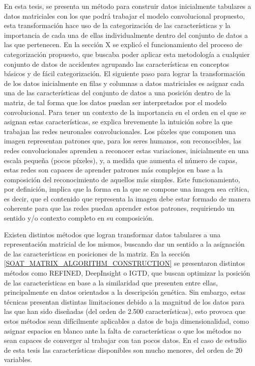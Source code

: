 \documentclass{uathesis-es}
\begin{document}
{	En esta tesis, se presenta un método para construir datos inicialmente tabulares a datos matriciales con los que podrá trabajar el modelo convolucional propuesto, esta transformación hace uso de la categorización de las características y la importancia de cada una de ellas individualmente dentro del conjunto de datos a las que pertenecen. En la sección X se explicó el funcionamiento del proceso de categorización propuesto, que buscaba poder aplicar esta metodología a cualquier conjunto de datos de accidentes agrupando las características en conceptos básicos y de fácil categorización. El siguiente paso para lograr la transformación de los datos inicialmente en filas y columnas a datos matriciales es asignar cada una de las características del conjunto de datos a una posición dentro de la matriz, de tal forma que los datos puedan ser interpretados por el modelo convolucional. Para tener un contexto de la importancia en el orden en el que se asignan estas características, se explica brevemente la intuición sobre la que trabajan las redes neuronales convolucionales. Los píxeles que componen una imagen representan patrones que, para los seres humanos, son reconocibles, las redes convolucionales aprenden a reconocer estas variaciones, inicialmente en una escala pequeña (pocos píxeles), y, a medida que aumenta el número de capas, estas redes son capaces de aprender patrones más complejos en base a la composición del reconocimiento de aquellos más simples. Este funcionamiento, por definición, implica que la forma en la que se compone una imagen sea crítica, es decir, que el contenido que representa la imagen debe estar formado de manera coherente para que las redes puedan aprender estos patrones, requiriendo un sentido y/o contexto completo en su composición.
	
	Existen distintos métodos que logran transformar datos tabulares a una representación matricial de los mismos, buscando dar un sentido a la asignación de las características en posiciones de la matriz. En la sección \ref{SOAT_MATRIX_ALGORITHM_CONSTRUCTION} se presentaron distintos métodos como REFINED, DeepInsight o IGTD, que buscan optimizar la posición de las características en base a la similaridad que presenten entre ellas, principalmente en datos orientados a la descripción genética. Sin embargo, estas técnicas presentan distintas limitaciones debido a la magnitud de los datos para las que han sido diseñadas (del orden de 2.500 características), esto provoca que estos métodos sean difícilmente aplicables a datos de baja dimensionalidad, como asignar espacios en blanco ante la falta de características o que los métodos no sean capaces de converger al trabajar con tan pocos datos. En el caso de estudio de esta tesis las características disponibles son mucho menores, del orden de 20 variables.
	
}
\end{document}
